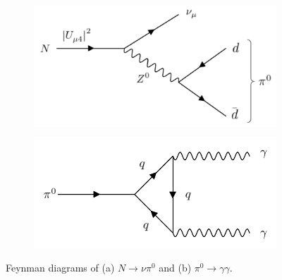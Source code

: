 
\begin{figure}[htbp!]
\begin{subfigure}[h]{0.49\linewidth}
\centering    
\includegraphics[width=\linewidth]{N_to_pi0_edit}
\caption{}
\label{fig:HNLdecaydiagram}
\end{subfigure}
\hfill
\begin{subfigure}[h]{0.49\linewidth}
\centering    
\includegraphics[width=\linewidth]{pi0_to_gam}
\caption{}
\label{fig:pi0decaydiagram}
\end{subfigure}%
\caption[Heavy Neutral Lepton and Neutral Pion Decay Feynman Diagrams]{
Feynman diagrams of (a) $N \rightarrow \nu \pi^0$ and (b) $\pi^0 \rightarrow \gamma\gamma$.
}
\end{figure}



